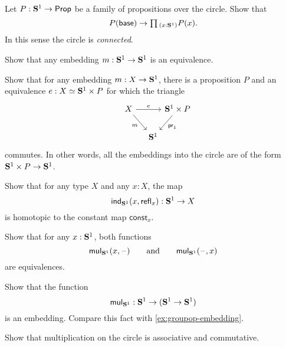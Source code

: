 \begin{exercises}
  \exercise \label{ex:circle-connected}
  \begin{subexenum}
  \item Let $P:\mathbf{S}^{1}\to\mathsf{Prop}$ be a family of propositions over the circle. Show that
    \begin{equation*}
      P(\base)\to\prd{x:\sphere{1}}P(x).
    \end{equation*}
    In this sense the circle is \emph{connected}.
  \item Show that any embedding $m:\mathbf{S}^{1}\to\mathbf{S}^{1}$ is an equivalence.
  \item Show that for any embedding $m:X\to\mathbf{S}^{1}$, there is a proposition $P$ and an equivalence $e:\eqv{X}{\sphere{1}\times P}$ for which the triangle
    \begin{equation*}
      \begin{tikzcd}[column sep=0]
        X \arrow[dr,swap,"m"] \arrow[rr,"e"] & & \sphere{1}\times P \arrow[dl,"\proj 1"] \\
        \phantom{\sphere{1}\times P} & \sphere{1}
      \end{tikzcd}
    \end{equation*}
    commutes. In other words, all the embeddings into the circle are of the form $\mathbf{S}^{1}\times P\to \mathbf{S}^{1}$.
  \end{subexenum}
  \exercise \label{ex:circle-constant}
  Show that for any type $X$ and any $x:X$, the map
  \begin{equation*}
    \mathsf{ind}_{\mathbf{S}^{1}}(x,\mathsf{refl}_{x}):\mathbf{S}^{1}\to X
  \end{equation*}
  is homotopic to the constant map $\mathsf{const}_x$.
  \exercise \label{ex:mulcircle-is-equiv}
  \begin{subexenum}
  \item Show that for any $x:\mathbf{S}^{1}$, both functions
    \begin{equation*}
      \mathsf{mul}_{\mathbf{S}^{1}}(x,\mathord{\hspace{1pt}\text{--}\hspace{1pt}})\qquad\text{and}\qquad\mathsf{mul}_{\mathbf{S}^{1}}(\mathord{\hspace{1pt}\text{--}\hspace{1pt}},x)
    \end{equation*}
    are equivalences.
  \item Show that the function
    \begin{equation*}
      \mathsf{mul}_{\mathbf{S}^{1}} : \mathbf{S}^{1}\to(\mathbf{S}^{1}\to\mathbf{S}^{1})
    \end{equation*}
    is an embedding. Compare this fact with \cref{ex:groupop-embedding}.
  \item Show that multiplication on the circle is associative and commutative.
  \end{subexenum}

\end{exercises}
